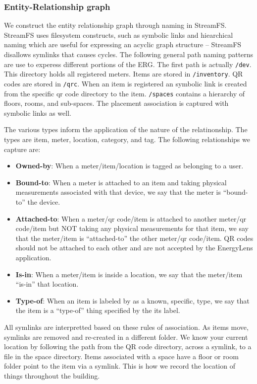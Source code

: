 \subsubsection{Entity-Relationship graph}
We construct the entity relationship graph through naming in StreamFS.  StreamFS uses filesystem constructs, such as symbolic
links and hiearchical naming which are useful for expressing an acyclic graph structure -- StreamFS disallows symlinks that causes cycles.  
The following general path naming patterns are use to experess different portions of the ERG.
The first path is actually {\tt /dev}.  This directory
holds all registered meters.  Items are stored in {\tt /inventory}.  QR codes are stored in {\tt /qrc}.  When an item is registered an 
symbolic link is created from the specific qr code directory to the item.  {\tt /spaces} contains a hierarchy of floors, rooms, 
and sub-spaces.  The placement association is captured with symbolic links as well.

The various types inform the application of the nature of the relatinonship.  The types are item, meter, 
location, category, and tag.  The following relationships we capture are:

\begin{itemize}
\item {\bf Owned-by}: When a meter/item/location is tagged as belonging to a user.
\item {\bf Bound-to}: When a meter is attached to an item and taking physical measurements associated with that 
		device, we say that the meter is ``bound-to'' the device.
\item {\bf Attached-to}: When a meter/qr code/item is attached to another meter/qr code/item but NOT taking any 
		physical measurements for that item, we say that the meter/item is ``attached-to'' the other meter/qr 
		code/item.  QR codes should not be attached to each other and are not accepted by the EnergyLens application.
\item {\bf Is-in}: When a meter/item is inside a location, we say that the meter/item ``is-in'' that location.
\item {\bf Type-of}: When an item is labeled by as a known, specific, type, we say that the item is a ``type-of'' thing 
		specified by the its label.
\end{itemize}

All symlinks are interpretted based on these rules of association.  As items move, symlinks are removed and re-created
in a different folder.  We know your current location by following the path from the QR code directory, across a symlink, 
to a file in the space directory.  Items associated with a space have a floor or room folder point to the item
via a symlink.  This is how we record the location of things throughout the building.


